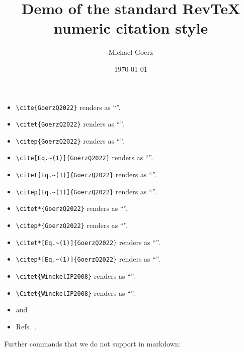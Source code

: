 \documentclass[aps,pra,onecolumn,noshowpacs,superscriptaddress,preprintnumbers,%
kamsmath,amssymb,notitlepage,letterpaper]{revtex4-2}
\def\Author{Michael Goerz}
\def\Title{Demo of the standard RevTeX numeric citation style}
\begin{document}
\title{\Title}
\author{\Author}
\date{\today}

\maketitle


\begin{itemize}
  \item \verb|\cite{GoerzQ2022}| renders as ``\cite{GoerzQ2022}''.
  \item \verb|\citet{GoerzQ2022}| renders as ``\citet{GoerzQ2022}''.
  \item \verb|\citep{GoerzQ2022}| renders as ``\citep{GoerzQ2022}''.
  \item \verb|\cite[Eq.~(1)]{GoerzQ2022}| renders as ``\cite[Eq.~(1)]{GoerzQ2022}''.
  \item \verb|\citet[Eq.~(1)]{GoerzQ2022}| renders as ``\citet[Eq.~(1)]{GoerzQ2022}''.
  \item \verb|\citep[Eq.~(1)]{GoerzQ2022}| renders as ``\citep[Eq.~(1)]{GoerzQ2022}''.
  \item \verb|\citet*{GoerzQ2022}| renders as ``\citet*{GoerzQ2022}''.
  \item \verb|\citep*{GoerzQ2022}| renders as ``\citep*{GoerzQ2022}''.
  \item \verb|\citet*[Eq.~(1)]{GoerzQ2022}| renders as ``\citet*[Eq.~(1)]{GoerzQ2022}''.
  \item \verb|\citep*[Eq.~(1)]{GoerzQ2022}| renders as ``\citep*[Eq.~(1)]{GoerzQ2022}''.
  \item \verb|\citet{WinckelIP2008}| renders as ``\citet{WinckelIP2008}''.
  \item \verb|\Citet{WinckelIP2008}| renders as ``''.
  \item \cite{GoerzPhd2015} and \cite{Luc-KoenigEPJD2004}
  \item Refs.~\cite[and references therein]{WinckelIP2008,BrumerShapiro2003,BrifNJP2010,Shapiro2012,KochJPCM2016,GoerzQ2022,SolaAAMOP2018,MorzhinRMS2019,KochEPJQT2022}.
\end{itemize}

Further commands that we do not support in markdown:
\end{document}
